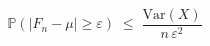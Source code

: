 \documentclass[preview]{standalone}
\begin{document}
\begin{align*}
\mathbb{P}\!\left(|F_n - \mu|\geq\varepsilon\right)\;\leq\;\dfrac{\mathrm{Var}(X)}{n\,\varepsilon^2}
\end{align*}
\end{document}
